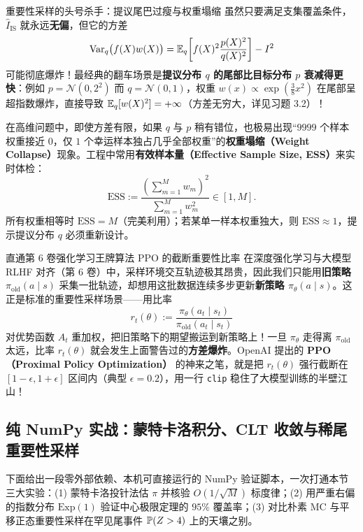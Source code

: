 \begin{failBox}{重要性采样的头号杀手：提议尾巴过瘦与权重塌缩}
虽然只要满足支集覆盖条件，$\hat{I}_{\mathrm{IS}}$ 就永远\textbf{无偏}，但它的方差
\[
  \operatorname{Var}_q\bigl(f(X)w(X)\bigr) = \mathbb{E}_q\!\left[f(X)^2\frac{p(X)^2}{q(X)^2}\right] - I^2
\]
可能彻底爆炸！最经典的翻车场景是\textbf{提议分布 $q$ 的尾部比目标分布 $p$ 衰减得更快}：例如 $p = \mathcal{N}(0, 2^2)$ 而 $q = \mathcal{N}(0, 1)$，权重 $w(x) \propto \exp(\tfrac{3}{8}x^2)$ 在尾部呈超指数爆炸，直接导致 $\mathbb{E}_q[w(X)^2] = +\infty$（方差无穷大，详见习题 3.2）！

在高维问题中，即使方差有限，如果 $q$ 与 $p$ 稍有错位，也极易出现“$9999$ 个样本权重接近 $0$，仅 $1$ 个幸运样本独占几乎全部权重”的\textbf{权重塌缩（Weight Collapse）}现象。工程中常用\textbf{有效样本量（Effective Sample Size, ESS）}来实时体检：
\[
  \mathrm{ESS} := \frac{\left(\sum_{m=1}^M w_m\right)^2}{\sum_{m=1}^M w_m^2} \in [1, M].
\]
所有权重相等时 $\mathrm{ESS} = M$（完美利用）；若某单一样本权重独大，则 $\mathrm{ESS} \approx 1$，提示提议分布 $q$ 必须重新设计。
\end{failBox}

\begin{insightBox}{直通第 6 卷强化学习王牌算法 PPO 的截断重要性比率}
在深度强化学习与大模型 RLHF 对齐（第 6 卷）中，采样环境交互轨迹极其昂贵，因此我们只能用\textbf{旧策略 $\pi_{\text{old}}(a\mid s)$} 采集一批轨迹，却想用这批数据连续多步更新\textbf{新策略 $\pi_\theta(a\mid s)$}。这正是标准的重要性采样场景——用比率
\[
  r_t(\theta) := \frac{\pi_\theta(a_t \mid s_t)}{\pi_{\text{old}}(a_t \mid s_t)}
\]
对优势函数 $A_t$ 重加权，把旧策略下的期望搬运到新策略上！一旦 $\pi_\theta$ 走得离 $\pi_{\text{old}}$ 太远，比率 $r_t(\theta)$ 就会发生上面警告过的\textbf{方差爆炸}。OpenAI 提出的 \textbf{PPO（Proximal Policy Optimization）} 的神来之笔，就是把 $r_t(\theta)$ 强行截断在 $[1-\epsilon, 1+\epsilon]$ 区间内（典型 $\epsilon = 0.2$），用一行 \texttt{clip} 稳住了大模型训练的半壁江山！
\end{insightBox}

\subsection{纯 NumPy 实战：蒙特卡洛积分、CLT 收敛与稀尾重要性采样}

下面给出一段零外部依赖、本机可直接运行的 NumPy 验证脚本，一次打通本节三大实验：(1) 蒙特卡洛投针法估 $\pi$ 并核验 $O(1/\sqrt{M})$ 标度律；(2) 用严重右偏的指数分布 $\mathrm{Exp}(1)$ 验证中心极限定理的 $95\%$ 覆盖率；(3) 对比朴素 MC 与平移正态重要性采样在罕见尾事件 $\mathbb{P}(Z > 4)$ 上的天壤之别。

